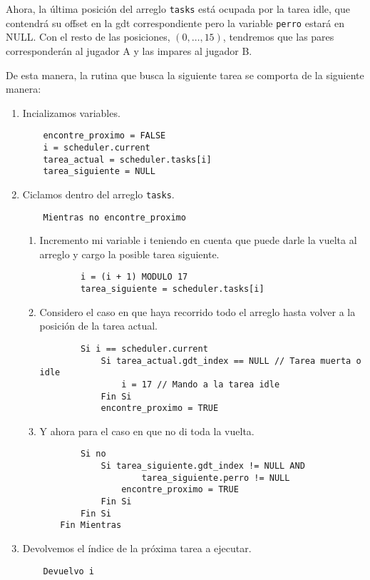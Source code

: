 Ahora, la última posición del arreglo \texttt{tasks} está ocupada por la tarea
idle, que contendrá su offset en la gdt correspondiente pero la variable
\texttt{perro} estará en NULL. Con el resto de las posiciones, $(0, \dots, 15)$,
tendremos que las pares corresponderán al jugador A y las impares al jugador B.

De esta manera, la rutina que busca la siguiente tarea se comporta de la
siguiente manera:

\begin{enumerate}
	\item Incializamos variables.
	\begin{lstlisting}
	encontre_proximo = FALSE
	i = scheduler.current
	tarea_actual = scheduler.tasks[i]
	tarea_siguiente = NULL
	\end{lstlisting}

	\item Ciclamos dentro del arreglo \texttt{tasks}.
	\begin{lstlisting}
	Mientras no encontre_proximo
	\end{lstlisting}
	\begin{enumerate}
		\item Incremento mi variable i teniendo en cuenta que puede darle la
			vuelta al arreglo y cargo la posible tarea siguiente.
	\begin{lstlisting}
		i = (i + 1) MODULO 17
		tarea_siguiente = scheduler.tasks[i]
	\end{lstlisting}
		\item Considero el caso en que haya recorrido todo el arreglo hasta
			volver a la posición de la tarea actual.
	\begin{lstlisting}
		Si i == scheduler.current
			Si tarea_actual.gdt_index == NULL // Tarea muerta o idle
				i = 17 // Mando a la tarea idle
			Fin Si
			encontre_proximo = TRUE
	\end{lstlisting}
		\item Y ahora para el caso en que no di toda la vuelta.
	\begin{lstlisting}
		Si no
			Si tarea_siguiente.gdt_index != NULL AND
					tarea_siguiente.perro != NULL
				encontre_proximo = TRUE
			Fin Si
		Fin Si
	Fin Mientras
	\end{lstlisting}
	\end{enumerate}
	\item Devolvemos el índice de la próxima tarea a ejecutar.
	\begin{lstlisting}
	Devuelvo i
	\end{lstlisting}
\end{enumerate}

